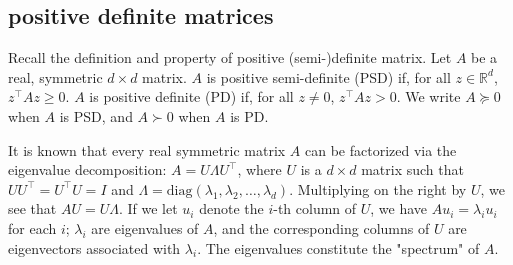 \documentclass[lang=cn,11pt]{elegantbook}
\begin{document}
\subsection{positive definite matrices}
Recall the definition and property of positive (semi-)definite matrix. Let \(A\) be a real, symmetric \(d \times d\) matrix. \(A\) is positive semi-definite (PSD) if, for all \(z \in \mathbb{R}^d\), \(z^\top A z \geq 0\). \(A\) is positive definite (PD) if, for all \(z \neq 0\), \(z^\top A z > 0\). We write \(A \succeq 0\) when \(A\) is PSD, and \(A \succ 0\) when \(A\) is PD.

It is known that every real symmetric matrix \(A\) can be factorized via the eigenvalue decomposition:
\(A = U \Lambda U^\top\), where \(U\) is a \(d \times d\) matrix such that \(UU^\top = U^\top U = I\) and \(\Lambda = \text{diag}(\lambda_1, \lambda_2, \ldots, \lambda_d)\). Multiplying on the right by \(U\), we see that \(AU = U \Lambda\). If we let \(u_i\) denote the \(i\)-th column of \(U\), we have \(Au_i = \lambda_i u_i\) for each \(i\); \(\lambda_i\) are eigenvalues of \(A\), and the corresponding columns of \(U\) are eigenvectors associated with \(\lambda_i\). The eigenvalues constitute the "spectrum" of \(A\).
\end{document}
